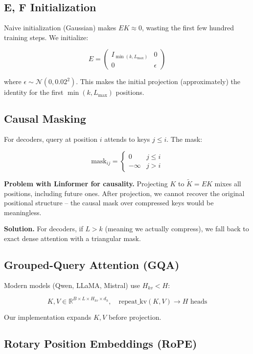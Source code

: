 \subsection{E, F Initialization}

Naive initialization (Gaussian) makes $E K \approx 0$, wasting the first 
few hundred training steps. We initialize:

\[
E = \begin{pmatrix} I_{\min(k, L_\text{max})} & 0 \\ 0 & \epsilon \end{pmatrix}
\tag{3.6}
\]

where $\epsilon \sim \mathcal{N}(0, 0.02^2)$. This makes the initial 
projection (approximately) the identity for the first $\min(k, L_\text{max})$ 
positions.

\subsection{Causal Masking}

For decoders, query at position $i$ attends to keys $j \leq i$. The mask:

\[
\text{mask}_{ij} = \begin{cases} 0 & j \leq i \\ -\infty & j > i \end{cases}
\tag{3.7}
\]

\textbf{Problem with Linformer for causality.} Projecting $K$ to $\tilde{K} = E K$ 
mixes all positions, including future ones. After projection, we cannot 
recover the original positional structure -- the causal mask over compressed 
keys would be meaningless.

\textbf{Solution.} For decoders, if $L > k$ (meaning we actually compress), we 
fall back to exact dense attention with a triangular mask.

\subsection{Grouped-Query Attention (GQA)}

Modern models (Qwen, LLaMA, Mistral) use $H_{kv} < H$:

\[
K, V \in \mathbb{R}^{B \times L \times H_{kv} \times d_h}, \quad
\text{repeat\_kv}(K, V) \to H \text{ heads}
\tag{3.8}
\]

Our implementation expands $K, V$ before projection.

\subsection{Rotary Position Embeddings (RoPE)}

